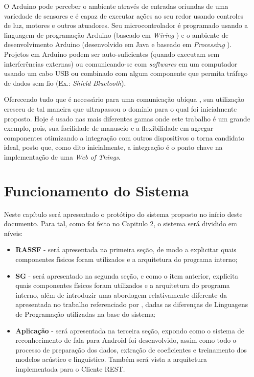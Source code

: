 \documentclass[12pt,a4paper,oneside]{report}
\begin{document}
O Arduino pode perceber o ambiente através de entradas oriundas de uma variedade de sensores e é capaz de executar ações ao seu redor usando controles de luz, motores e outros atuadores. Seu microcontrolador é programado usando a linguagem de programação Arduino \cite{arduinoapi} (baseado em \emph{Wiring} \cite{wiring}) e o ambiente de desenvolvimento Arduino (desenvolvido em Java e baseado em \emph{Processing} \cite{processing}). Projetos em Arduino podem ser auto-suficientes (quando executam sem interferências externas) ou comunicando-se com \emph{softwares} em um computador usando um cabo USB ou combinado com algum componente que permita tráfego de dados sem fio (Ex.: \emph{Shield Bluetooth}).

Oferecendo tudo que é necessário para uma comunicação ubíqua \cite{Mark Weiser}, sua utilização cresceu de tal maneira que ultrapassou o domínio para o qual foi inicialmente proposto. Hoje é usado nas mais diferentes gamas onde este trabalho é um grande exemplo, pois, sua facilidade de manuseio e a flexibilidade em agregar componentes otimizando a integração com outros dispositivos o torna candidato ideal, posto que, como dito inicialmente, a integração é o ponto chave na implementação de uma \emph{Web of Things}.

\chapter{Funcionamento do Sistema}
\label{chap:funcionamento}

Neste capítulo será apresentado o protótipo do sistema proposto no início deste documento. Para tal, como foi feito no Capitulo 2, o sistema será dividido em níveis:

\begin{itemize}
    \item \textbf{RASSF} - será apresentada na primeira seção, de modo a explicitar quais componentes físicos foram utilizados e a arquitetura do programa interno;
    \item \textbf{SG} - será apresentado na segunda seção, e como o item anterior, explicita quais componentes físicos foram utilizados e a arquitetura do programa interno, além de introduzir uma abordagem relativamente diferente da apresentada no trabalho referenciado por \cite{sgtriwiguiboh}, dadas as diferenças de Linguagens de Programação utilizadas na base do sistema;
    \item \textbf{Aplicação} -  será apresentada na terceira seção, expondo como o sistema de reconhecimento de fala para Android foi desenvolvido, assim como todo o processo de preparação dos dados, extração de coeficientes e treinamento dos modelos acústico e linguístico. Também será vista a arquitetura implementada para o Cliente REST.
\end{itemize}
\end{document}
